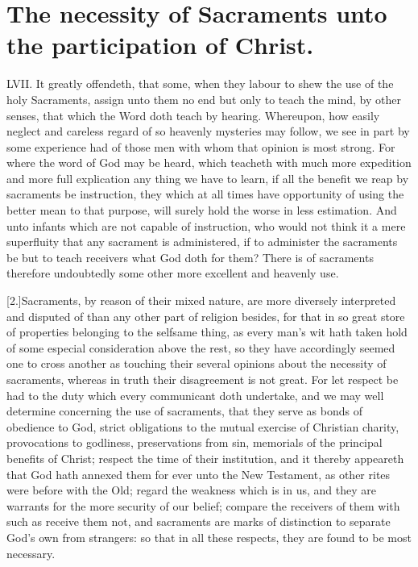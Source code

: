 \section*{The necessity of Sacraments unto the participation of Christ.}
LVII. It greatly offendeth, that some, when they labour to shew the use of the holy Sacraments, assign unto them no end but only to teach the mind, by other senses, that which the Word doth teach by hearing. Whereupon, how easily neglect and careless regard of so heavenly mysteries may follow, we see in part by some experience had of those men with whom that opinion is most strong. For where the word of God may be heard, which teacheth with much more expedition and more full explication any thing we have to learn, if all the benefit we reap by sacraments be instruction, they which at all times have opportunity of using the better mean to that purpose, will surely hold the worse in less estimation. And unto infants which are not capable of instruction, who would not think it a mere superfluity that any sacrament is administered, if to administer the sacraments be but to teach receivers what God doth for them? There is of sacraments therefore undoubtedly some other more excellent and heavenly use.




[2.]Sacraments, by reason of their mixed nature, are more diversely interpreted and disputed of than any other part of religion besides, for that in so great store of properties belonging to the selfsame thing, as every man’s wit hath taken hold of some especial consideration above the rest, so they have accordingly seemed one to cross another as touching their several opinions about the necessity of sacraments, whereas in truth their disagreement is not great. For let respect be had to the duty which every communicant doth undertake, and we may well determine concerning the use of sacraments, that they serve as bonds of obedience to God, strict obligations to the mutual exercise of Christian charity, provocations to godliness, preservations from sin, memorials of the principal benefits of Christ; respect the time of their institution, and it thereby appeareth that God hath annexed them for ever unto the New Testament, as other rites were before with the Old; regard the weakness which is in us, and they are warrants for the more security of our belief; compare the receivers of them with such as receive them not, and sacraments are marks of distinction to separate God’s own from strangers: so that in all these respects, they are found to be most necessary.

